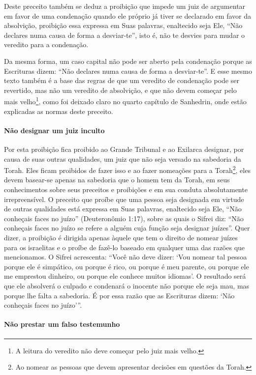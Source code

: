 Deste preceito também se deduz a proibição que impede um juiz de
argumentar em favor de uma condenação quando ele próprio já tiver se
declarado em favor da absolvição, proibição essa expressa em Suas
palavras, enaltecido seja Ele, ``Não declares numa causa de forma a
desviar-te'', isto é, não te desvies para mudar o veredito para a
condenação.

Da mesma forma, um caso capital não pode ser aberto pela condenação
porque as Escrituras dizem: ``Não declares numa causa de forma a
desviar-te''. E esse mesmo texto também é a base das regras de que um
veredito de condenação pode ser revertido, mas não um veredito de
absolvição, e que não devem começar pelo mais
velho\footnote{A leitura do veredito não deve começar pelo juiz mais velho.}, como foi deixado claro no quarto capítulo
de Sanhedrin, onde estão explicadas as normas deste preceito.

\paragraph{Não designar um juiz inculto}

Por esta proibição fica proibido ao Grande Tribunal e ao Exilarca
designar, por causa de suas outras qualidades, um juiz que não seja
versado na sabedoria da Torah. Eles ficam proibidos de fazer isso e ao
fazer nomeações para a Torah\footnote{Ao nomear as pessoas que devem apresentar decisões em questões da Torah.}, eles devem basear-se
apenas na sabedoria que o homem tem da Torah, em seus conhecimentos
sobre seus preceitos e proibições e em sua conduta absolutamente
irrepreensível. O preceito que proíbe que uma pessoa seja designada em
virtude de outras qualidades está expressa em Suas palavras, enaltecido
seja Ele, ``Não conheçais faces no juízo'' (Deuteronômio 1:17), sobre
as quais o Sifrei diz: ``Não conheçais faces no juízo se refere a alguém
cuja função seja designar juízes''. Quer dizer, a proibição é dirigida
apenas àquele que tem o direito de nomear juízes para os israelitas e o
proíbe de fazê-lo baseado em qualquer uma das razões que mencionamos. O
Sifrei acrescenta: ``Você não deve dizer: `Vou nomear tal pessoa porque
ele é simpático, ou porque é rico, ou porque é meu parente, ou porque
ele me emprestou dinheiro, ou porque ele conhece muitos idiomas'. O
resultado será que ele absolverá o culpado e condenará o inocente não
porque ele seja mau, mas porque lhe falta a sabedoria. É por essa razão
que as Escrituras dizem: `Não conheçais faces no juízo'''.

\paragraph{Não prestar um falso testemunho}


